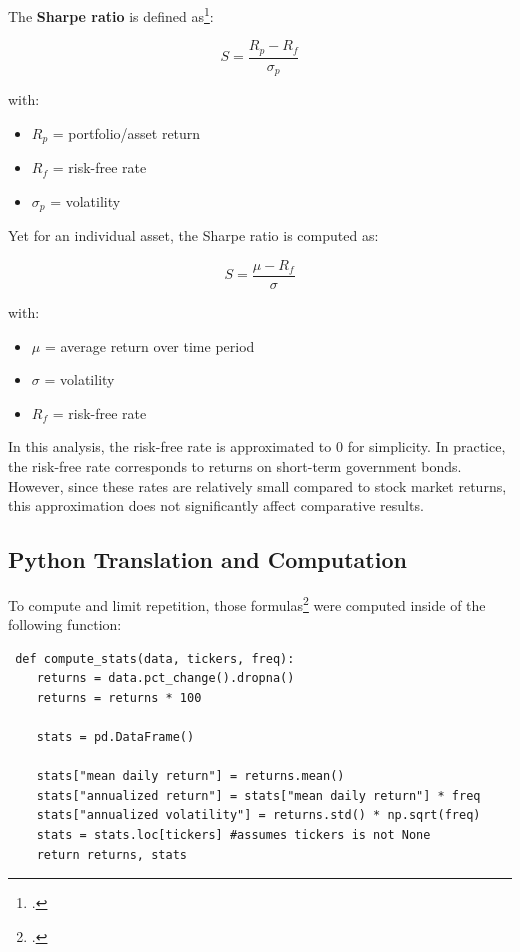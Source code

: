 \documentclass{article}
\begin{document}
\pagebreak

The \textbf{Sharpe ratio} is defined as\footcite{HommUlrich2012BtSr}:

$$ S= \frac{R_p - R_f}{\sigma_p}$$

with:
\begin{itemize}
    \item $R_p$ = portfolio/asset return
    \item $R_f$ = risk-free rate
    \item $\sigma_p$ = volatility 
\end{itemize}

Yet for an individual asset, the Sharpe ratio is computed as:

$$
S = \frac{\mu - R_f}{\sigma}
$$

with: 
\begin{itemize}
    \item $\mu$ = average return over time period
    \item $\sigma$ = volatility
    \item $R_f$ = risk-free rate
\end{itemize}

In this analysis, the risk-free rate is approximated to 0 for simplicity. In practice, the risk-free rate corresponds to returns on short-term government bonds.
However, since these rates are relatively small compared to stock market returns, this approximation does not significantly affect comparative results.

\vspace{0.3cm}
\subsection{Python Translation and Computation}
To compute and limit repetition, those formulas\footcite{numpy} were computed inside of the following function: 

\begin{lstlisting}
 def compute_stats(data, tickers, freq):
    returns = data.pct_change().dropna() 
    returns = returns * 100

    stats = pd.DataFrame()

    stats["mean daily return"] = returns.mean()
    stats["annualized return"] = stats["mean daily return"] * freq
    stats["annualized volatility"] = returns.std() * np.sqrt(freq)
    stats = stats.loc[tickers] #assumes tickers is not None
    return returns, stats
\end{lstlisting}
\end{document}
